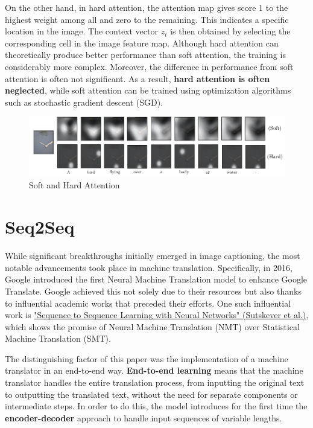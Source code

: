 On the other hand, in hard attention, the attention map gives score 1 to the highest weight among all and zero to the remaining. This indicates a specific location in the image. The context vector $z_t$ is then obtained by selecting the corresponding cell in the image feature map. Although hard attention can theoretically produce better performance than soft attention, the training is considerably more complex. Moreover, the difference in performance from soft attention is often not significant. As a result, \textbf{hard attention is often neglected}, while soft attention can be trained using optimization algorithms such as stochastic gradient descent (SGD).

\begin{figure}[!htbp]
    \centering
    \includegraphics[width=\linewidth]{tikz/chapter7 - Attention Types.pdf}
    \caption{Soft and Hard Attention}
\end{figure}

\section{Seq2Seq}

While significant breakthroughs initially emerged in image captioning, the most notable advancements took place in machine translation. Specifically, in 2016, Google introduced the first Neural Machine Translation model to enhance Google Translate.  Google achieved this not solely due to their resources but also thanks to influential academic works that preceded their efforts. One such influential work is  \href{https://arxiv.org/pdf/1409.3215}{"Sequence to Sequence Learning with Neural Networks" (Sutskever et al.)}, which shows the promise of Neural Machine Translation (NMT) over Statistical Machine Translation (SMT).

The distinguishing factor of this paper was the implementation of a machine translator in an end-to-end way. \textbf{End-to-end learning} means that the machine translator handles the entire translation process, from inputting the original text to outputting the translated text, without the need for separate components or intermediate steps. In order to do this, the model introduces for the first time the \textbf{encoder-decoder} approach to handle input sequences of variable lengths. 

